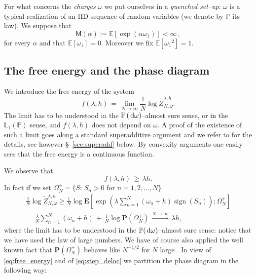 \documentclass[reqno,11pt]{amsart}
\numberwithin{equation}{section}
\DeclareMathOperator{\sign}{\mathrm{sign}}
\renewcommand{\tilde}{\widetilde}
\newcommand{\bP}{{\ensuremath{\mathbf P}} }
\newcommand{\bE}{{\ensuremath{\mathbf E}} }
\newcommand{\dd}{\,\text{\rm d}}             %
\newcommand{\bbE}{{\ensuremath{\mathbb E}} }
\newcommand{\bbL}{{\ensuremath{\mathbb L}} }
\newcommand{\bbP}{{\ensuremath{\mathbb P}} }
\newcommand{\ga}{\alpha}
\newcommand{\go}{\omega}
\newcommand{\gO}{\Omega}
\newcommand{\gl}{\lambda}
\newcommand{\M}{\textsf{M}}
\begin{document}
\smallskip

For what concerns the {\sl charges} $\go$  we put ourselves in a
 {\sl quenched set--up}:
$\go$ is a typical realization
of an IID sequence of
 random variables (we denote by $\bbP$ its law).
We suppose that
\begin{equation}
\label{eq:hypM}
\M (\ga) := \bbE\left[ \exp\left( \ga \go_1 \right)\right]<\infty \, ,
\end{equation}
for every $\ga$ and that $\bbE\left[ \go_1 \right]=0$.
Moreover we fix $\bbE[ {\go_1}^2]=1$.


\subsection{The free energy and the phase diagram}

We introduce the free energy of the system
\begin{equation}
\label{eq:free_energy}
f(\gl ,h)\, = \, \lim_{N\to \infty} \frac 1N \log {\tilde Z}^{\gl, h}_{N,\go}.
\end{equation}
The limit has to be understood in the $\bbP\left( \dd \go \right)$--almost
sure sense, or
 in the $\bbL_1\left( \bbP\right)$
sense, and $f (\gl,h)$ does not depend on $\go$.
 A  proof of the existence of such a limit goes along a standard superadditive argument
and we refer to \cite{cf:G} for the details, see however \S~\ref{sec:superadd} below.
By convexity arguments one easily sees that the free energy is a continuous function.

We observe that
\begin{equation}
\label{eq:delocfe}
f(\gl , h) \, \ge \, \gl h.
\end{equation}
In fact if we set $\gO_N^+= \{S:\, S_n>0$ for $ n=1, 2, \ldots , N\}$
\begin{multline}
\label{eq:step_deloc}
\frac 1N \log {\tilde Z}_{N,\go}^{\gl, h}  \ge
\frac 1N \log \bE
\left[
\exp\left(
\gl \sum_{n=1}^N
\left( \go_n +h\right) \sign \left(S_n\right)
\right)
;  \gO_N^+
\right]
\\
= \frac {\gl} {N} \sum_{n=1}^N \left( \go_n +h\right) \, + \,
\frac 1N
\log \bP \left( \gO_N^+\right)\, \stackrel{N \to \infty}{\longrightarrow}\, \gl h ,
\end{multline}
where the limit has to be understood in the $\bbP(\dd \go)$--almost sure sense:
notice that
we have  used the law of large numbers.
We have of course also applied the
well known fact that $\bP\left( \gO_N^+\right)$ behaves like
$N^{-1/2}$ for $N$ large \cite[Ch. III]{cf:Feller}. In view of \eqref{eq:free_energy} and of \eqref{eq:step_deloc}
we partition the phase diagram in the following way:
\end{document}
